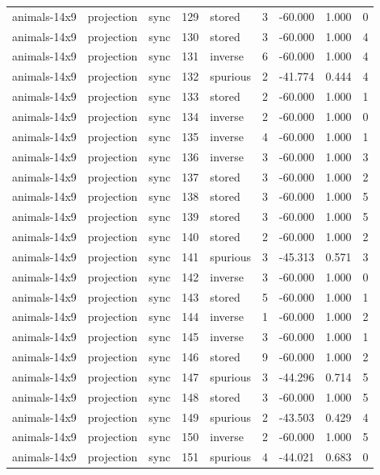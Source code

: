 \begin{tabular}{lllrlrrrr}
animals-14x9 & projection & sync & 129 & stored & 3 & -60.000 & 1.000 & 0 \\
animals-14x9 & projection & sync & 130 & stored & 3 & -60.000 & 1.000 & 4 \\
animals-14x9 & projection & sync & 131 & inverse & 6 & -60.000 & 1.000 & 4 \\
animals-14x9 & projection & sync & 132 & spurious & 2 & -41.774 & 0.444 & 4 \\
animals-14x9 & projection & sync & 133 & stored & 2 & -60.000 & 1.000 & 1 \\
animals-14x9 & projection & sync & 134 & inverse & 2 & -60.000 & 1.000 & 0 \\
animals-14x9 & projection & sync & 135 & inverse & 4 & -60.000 & 1.000 & 1 \\
animals-14x9 & projection & sync & 136 & inverse & 3 & -60.000 & 1.000 & 3 \\
animals-14x9 & projection & sync & 137 & stored & 3 & -60.000 & 1.000 & 2 \\
animals-14x9 & projection & sync & 138 & stored & 3 & -60.000 & 1.000 & 5 \\
animals-14x9 & projection & sync & 139 & stored & 3 & -60.000 & 1.000 & 5 \\
animals-14x9 & projection & sync & 140 & stored & 2 & -60.000 & 1.000 & 2 \\
animals-14x9 & projection & sync & 141 & spurious & 3 & -45.313 & 0.571 & 3 \\
animals-14x9 & projection & sync & 142 & inverse & 3 & -60.000 & 1.000 & 0 \\
animals-14x9 & projection & sync & 143 & stored & 5 & -60.000 & 1.000 & 1 \\
animals-14x9 & projection & sync & 144 & inverse & 1 & -60.000 & 1.000 & 2 \\
animals-14x9 & projection & sync & 145 & inverse & 3 & -60.000 & 1.000 & 1 \\
animals-14x9 & projection & sync & 146 & stored & 9 & -60.000 & 1.000 & 2 \\
animals-14x9 & projection & sync & 147 & spurious & 3 & -44.296 & 0.714 & 5 \\
animals-14x9 & projection & sync & 148 & stored & 3 & -60.000 & 1.000 & 5 \\
animals-14x9 & projection & sync & 149 & spurious & 2 & -43.503 & 0.429 & 4 \\
animals-14x9 & projection & sync & 150 & inverse & 2 & -60.000 & 1.000 & 5 \\
animals-14x9 & projection & sync & 151 & spurious & 4 & -44.021 & 0.683 & 0 \\

\end{tabular}
